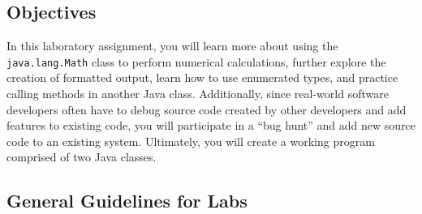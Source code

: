 


\vspace*{-.25in}
\subsection*{Objectives}

In this laboratory assignment, you will learn more about using the {\tt java.lang.Math} class to perform numerical
calculations, further explore the creation of formatted output, learn how to use enumerated types, and practice calling
methods in another Java class.  Additionally, since real-world software developers often have to debug source code
created by other developers and add features to existing code, you will participate in a ``bug hunt'' and add new
source code to an existing system. Ultimately, you will create a working program comprised of two Java classes.

\vspace*{-.1in}
\subsection*{General Guidelines for Labs}








